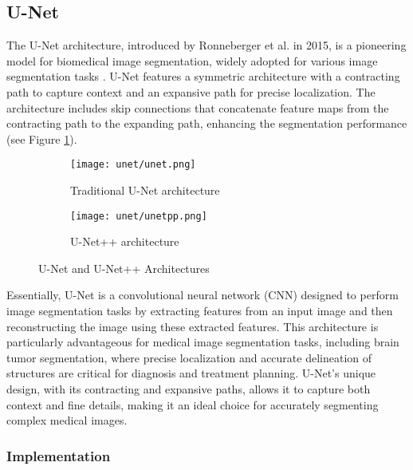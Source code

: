 \subsection{U-Net}\label{s:unet}

The U-Net architecture, introduced by Ronneberger et al. in 2015, is a pioneering model for biomedical image segmentation, widely adopted for various image segmentation tasks \cite{ronneberger_u-net_2015}. U-Net features a symmetric architecture with a contracting path to capture context and an expansive path for precise localization. The architecture includes skip connections that concatenate feature maps from the contracting path to the expanding path, enhancing the segmentation performance (see Figure \ref{fig:traditional_unet}).

\begin{figure}[H]
  \centering
  \begin{subfigure}[b]{0.45\textwidth}
    \centering
		\texttt{[image: unet/unet.png]}
    \caption{Traditional U-Net architecture \cite{Yakubovskiy_2019}}
    \label{fig:traditional_unet}
  \end{subfigure}
  \hfill
  \begin{subfigure}[b]{0.45\textwidth}
    \centering
		\texttt{[image: unet/unetpp.png]}
    \caption{U-Net++ architecture \cite{zhou_unet_2018}}
    \label{fig:unetpp_architecture}
  \end{subfigure}
  
  \caption{U-Net and U-Net++ Architectures}\label{f:unet_vs_unetpp}
\end{figure}

Essentially, U-Net is a convolutional neural network (CNN) designed to perform image segmentation tasks by extracting features from an input image and then reconstructing the image using these extracted features. This architecture is particularly advantageous for medical image segmentation tasks, including brain tumor segmentation, where precise localization and accurate delineation of structures are critical for diagnosis and treatment planning. U-Net's unique design, with its contracting and expansive paths, allows it to capture both context and fine details, making it an ideal choice for accurately segmenting complex medical images.


\subsubsection{Implementation}

